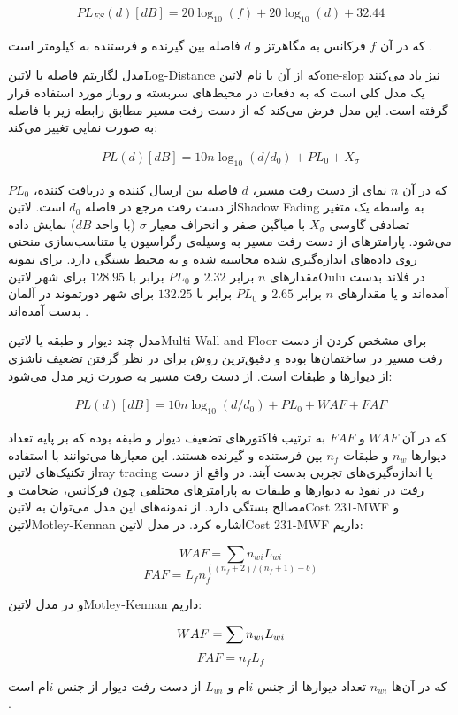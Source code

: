 \begin{align}
  PL_{FS}(d)[dB] = 20\log_{10}(f) + 20\log_{10}(d) + 32.44
\end{align}

که در آن $f$ فرکانس به مگاهرتز و $d$ فاصله بین گیرنده و فرستنده به کیلومتر است
.


مدل لگاریتم فاصله یا ‌لاتین{Log-Distance} که از آن با نام ‌لاتین{one-slop} نیز یاد می‌کنند یک مدل کلی
است که به دفعات در محیط‌های سربسته و روباز مورد استفاده قرار گرفته است.
این مدل فرض می‌کند که از دست رفت مسیر مطابق رابطه زیر با فاصله به صورت نمایی تغییر می‌کند:

\begin{align}
  PL(d)[dB] = 10n\log_{10}(d/d_0) + PL_0 + X_{\sigma}
\end{align}

که در آن $n$ نمای از دست رفت مسیر، $d$ فاصله بین ارسال کننده و دریافت کننده، $PL_0$
از دست رفت مرجع در فاصله $d_0$ است.
‌لاتین{Shadow Fading} به واسطه یک متغیر تصادفی گاوسی $X_{\sigma}$ با میاگین صفر و انحراف معیار $\sigma$ (با واحد $dB$)
نمایش داده می‌شود.
پارامترهای از دست رفت مسیر به وسیله‌ی رگراسیون یا متناسب‌سازی منحنی روی داده‌های اندازه‌گیری شده محاسبه شده و به محیط بستگی دارد.
برای نمونه مقدارهای $n$ برابر $2.32$ و $PL_0$ برابر با $128.95$ برای شهر ‌لاتین{Oulu} در فلاند بدست آمده‌اند و یا
مقدارهای $n$ برابر $2.65$ و $PL_0$ برابر با $132.25$ برای شهر دورتموند در آلمان بدست آمده‌اند
.


مدل چند دیوار و طبقه یا ‌لاتین{Multi-Wall-and-Floor} برای مشخص کردن از دست رفت مسیر در ساختمان‌ها بوده و دقیق‌ترین
روش برای در نظر گرفتن تضعیف ناشزی از دیوارها و طبقات است. از دست رفت مسیر به صورت زیر مدل می‌شود:

\begin{align}
  PL(d)[dB] = 10n\log_{10}(d/d_0) + PL_0 + WAF + FAF
\end{align}

که در آن $WAF$ و $FAF$ به ترتیب فاکتورهای تضعیف دیوار و طبقه بوده که بر پایه تعداد دیوارها $n_w$ و طبقات $n_f$ بین فرستنده و گیرنده هستند.
این معیارها می‌توانند با استفاده از تکنیک‌های ‌لاتین{ray tracing} یا اندازه‌گیری‌های تجربی بدست آیند.
در واقع از دست رفت در نفوذ به دیوارها و طبقات به پارامترهای مختلفی چون فرکانس، ضخامت و مصالح بستگی دارد.
از نمونه‌های این مدل می‌توان به ‌لاتین{Cost 231-MWF} و ‌لاتین{Motley-Kennan} اشاره کرد.
در مدل ‌لاتین{Cost 231-MWF} داریم:

\[
  WAF = \sum n_{wi}L_{wi}
\]
\[
  FAF = L_{f}n_{f}^{((n_f + 2) / (n_f + 1) - b)}
\]

و در مدل ‌لاتین{Motley-Kennan} داریم:

\[
  WAF = \sum n_{wi}L_{wi} \\
\]
\[
  FAF = n_fL_f
\]

که در آن‌ها $n_{wi}$ تعداد دیوارها از جنس $i$ام و $L_{wi}$ از دست رفت دیوار از جنس $i$ام است
.
